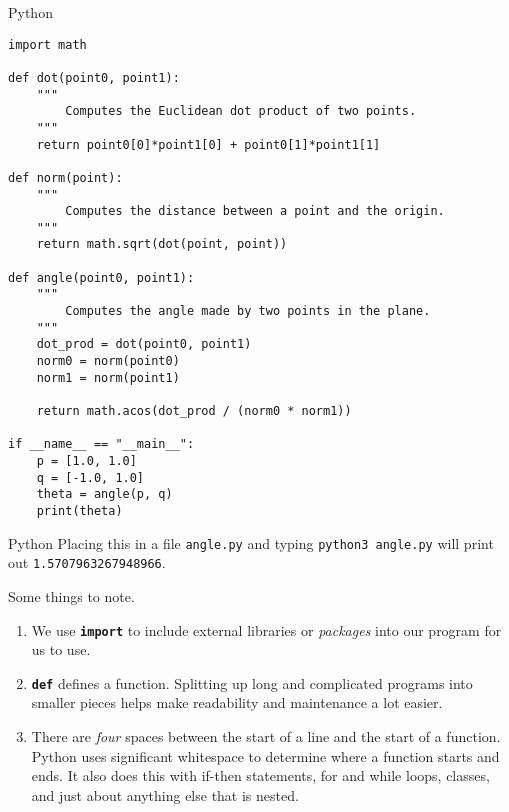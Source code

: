 \documentclass{beamer}
\begin{document}
    \begin{frame}[fragile]{Python}
        \begin{adjustbox}{width=0.5\textwidth,keepaspectratio}
            \begin{lstlisting}
import math

def dot(point0, point1):
    """
        Computes the Euclidean dot product of two points.
    """
    return point0[0]*point1[0] + point0[1]*point1[1]

def norm(point):
    """
        Computes the distance between a point and the origin.
    """
    return math.sqrt(dot(point, point))

def angle(point0, point1):
    """
        Computes the angle made by two points in the plane.
    """
    dot_prod = dot(point0, point1)
    norm0 = norm(point0)
    norm1 = norm(point1)

    return math.acos(dot_prod / (norm0 * norm1))

if __name__ == "__main__":
    p = [1.0, 1.0]
    q = [-1.0, 1.0]
    theta = angle(p, q)
    print(theta)
            \end{lstlisting}
        \end{adjustbox}
    \end{frame}
    \begin{frame}{Python}
        Placing this in a file \texttt{angle.py} and typing
        \texttt{python3 angle.py} will print out
        \texttt{1.5707963267948966}.
        \par\hfill\par
        Some things to note.
        \begin{enumerate}
            \item
                We use \textbf{\texttt{import}} to include external libraries
                or \textit{packages} into our program for us to use.
            \item
                \textbf{\texttt{def}} defines a function.
                Splitting up long and complicated programs into smaller
                pieces helps make readability and maintenance a lot easier.
            \item
                There are \textit{four} spaces between the start of a line and
                the start of a function. Python uses significant whitespace to
                determine where a function starts and ends. It also does this
                with if-then statements, for and while loops, classes, and
                just about anything else that is nested.
        \end{enumerate}
    \end{frame}
\end{document}
